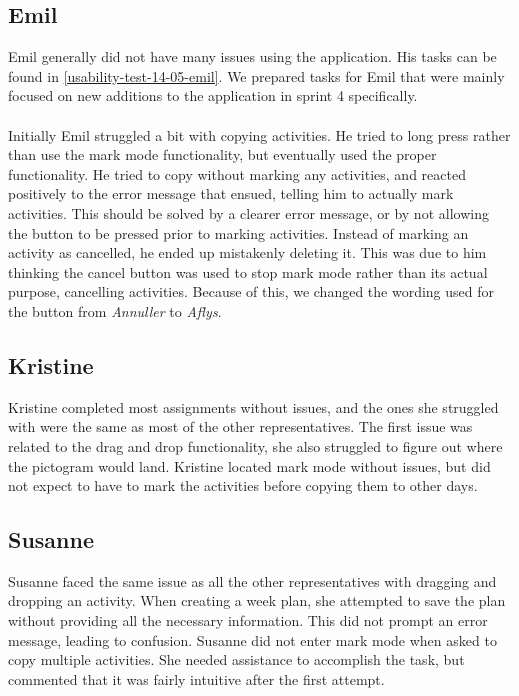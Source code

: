 \subsection{Emil}
Emil generally did not have many issues using the application. 
His tasks can be found in \autoref{usability-test-14-05-emil}.
We prepared tasks for Emil that were mainly focused on new additions to the application in sprint 4 specifically.
\\\\
Initially Emil struggled a bit with copying activities.
He tried to long press rather than use the mark mode functionality, but eventually used the proper functionality.
He tried to copy without marking any activities, and reacted positively to the error message that ensued, telling him to actually mark activities.
This should be solved by a clearer error message, or by not allowing the button to be pressed prior to marking activities.
Instead of marking an activity as cancelled, he ended up mistakenly deleting it.
This was due to him thinking the cancel button was used to stop mark mode rather than its actual purpose, cancelling activities.
Because of this, we changed the wording used for the button from \textit{Annuller} to \textit{Aflys}.

\subsection{Kristine}
Kristine completed most assignments without issues, and the ones she struggled with were the same as most of the other representatives.
The first issue was related to the drag and drop functionality, she also struggled to figure out where the pictogram would land.
Kristine located mark mode without issues, but did not expect to have to mark the activities before copying them to other days. 

\subsection{Susanne}
Susanne faced the same issue as all the other representatives with dragging and dropping an activity.
When creating a week plan, she attempted to save the plan without providing all the necessary information.
This did not prompt an error message, leading to confusion.
Susanne did not enter mark mode when asked to copy multiple activities.
She needed assistance to accomplish the task, but commented that it was fairly intuitive after the first attempt.

